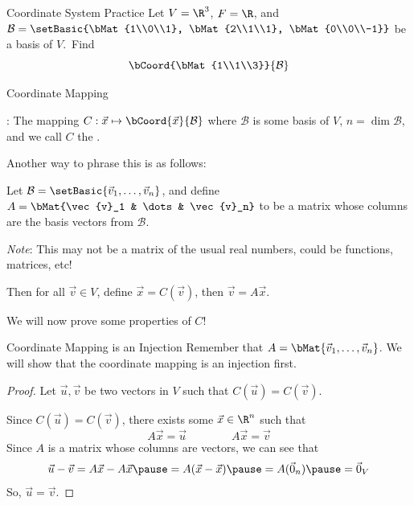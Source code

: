 \documentclass[xcoler=dvipsnames, aspectratio=169]{beamer}
\newcommand{\B}{\mathcal{B}}
\begin{document}
    \begin{frame}{Coordinate System Practice}
        Let $V=\R^3$, $F=\R$, and $\B=\setBasic{\bMat{1\\0\\1}, \bMat{2\\1\\1}, \bMat{0\\0\\-1}}$
        be a basis of $V$.\pause\
        Find
        \[
            \bCoord{\bMat{1\\1\\3}}{\B}
        \]
        \iftoggle{showSolutions}{
            \pause
        \[
            \bCoord{\bMat{1\\1\\3}}{\B} = \bMat{-1\\1\\-3}
        \]
        }{
            \vspace{100pt}
        }
    \end{frame}
    \begin{frame}{Coordinate Mapping}
        \begin{defn}
            : The mapping $C: \vec{x}\mapsto\bCoord{\vec{x}}{\B}$
            where $\B$ is some basis of $V$, $n=\dim{\B}$, and we call $C$ the .
        \end{defn}
        \pause
        Another way to phrase this is as follows:\pause

        \vspace{10pt}
        Let $\B=\setBasic{\vec{v}_1,\dots,\vec{v}_n}$, and define $A=\bMat{\vec{v}_1 & \dots & \vec{v}_n}$
        to be a matrix whose columns are the basis vectors from $\B$.\pause

        \vspace{10pt}
        \emph{Note}: This may not be a matrix of the usual real numbers, could be functions, matrices, etc!\pause

        Then for all $\vec{v}\in V$, define $\vec{x} = C(\vec{v})$, then $\vec{v} = A\vec{x}$.\pause
        \vspace{10pt}

        We will now prove some properties of $C$!
    \end{frame}
    \begin{frame}{Coordinate Mapping is an Injection}
        Remember that $A = \bMat{\vec{v}_1,\dots,\vec{v}_n}$. We will show that the coordinate mapping
        is an injection first.\pause
        \begin{proof}
            Let $\vec{u},\vec{v}$ be two vectors in $V$ such that $C(\vec{u}) = C(\vec{v})$.\pause

            Since $C(\vec{u}) = C(\vec{v})$, there exists some $\vec{x}\in\R^n$ such that
            \[
                A\vec{x} = \vec{u}\qquad\qquad A\vec{x}=\vec{v}
            \]\pause
            Since $A$ is a matrix whose columns are vectors, we can see that
            \[
                \vec{u}-\vec{v} = A\vec{x} - A\vec{x}\pause = A(\vec{x}-\vec{x})\pause =
                A(\vec{0}_n)\pause = \vec{0}_V
            \]\pause
            So, $\vec{u}=\vec{v}$.
        \end{proof}
    \end{frame}
\end{document}
